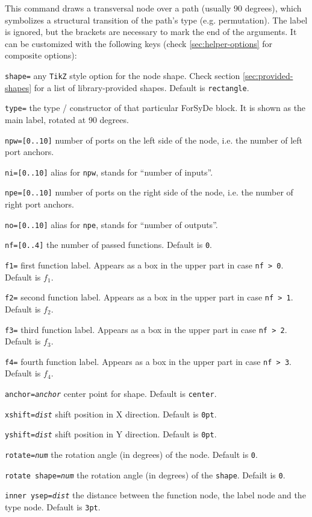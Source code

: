 \noindent This command draws a transversal node over a path (usually 90 degrees), which symbolizes a structural transition of the path's type (e.g. permutation). The label is ignored, but the brackets are necessary to mark the end of the arguments. It can be customized with the following keys (check \ref{sec:helper-options} for composite options):

\begin{optionslist}
\item \texttt{shape=} any \texttt{TikZ} style option for the node shape. Check section \ref{sec:provided-shapes} for a list of library-provided shapes. Default is \texttt{rectangle}.
\item \texttt{type=} the type / constructor of that particular ForSyDe block. It is shown as the main label, rotated at 90 degrees.
\item \texttt{npw=[0..10]} number of ports on the left side of the node, i.e. the number of left port anchors.
\item \texttt{ni=[0..10]} alias for \texttt{npw}, stands for ``number of inputs''.
\item \texttt{npe=[0..10]} number of ports on the right side of the node, i.e. the number of right port anchors.
\item \texttt{no=[0..10]} alias for \texttt{npe}, stands for ``number of outputs''.
\item \texttt{nf=[0..4]} the number of passed functions. Default is \texttt{0}.
\item \texttt{f1=} first function label. Appears as a box in the upper part in case \texttt{nf > 0}. Default is $f_1$.
\item \texttt{f2=} second function label. Appears as a box in the upper part in case \texttt{nf > 1}. Default is $f_2$.
\item \texttt{f3=} third function label. Appears as a box in the upper part in case \texttt{nf > 2}. Default is $f_3$.
\item \texttt{f4=} fourth function label. Appears as a box in the upper part in case \texttt{nf > 3}. Default is $f_4$.
\item \texttt{anchor=\it anchor} center point for shape. Default is \texttt{center}.
\item \texttt{xshift=\it dist} shift position in X direction. Default is \texttt{0pt}.
\item \texttt{yshift=\it dist} shift position in Y direction. Default is \texttt{0pt}.
\item \texttt{rotate=\it num} the rotation angle (in degrees) of the node. Default is \texttt{0}.
\item \texttt{rotate shape=\it num} the rotation angle (in degrees) of the \texttt{shape}. Defailt is \texttt{0}.
\item \texttt{inner ysep=\it dist} the distance between the function node, the label node and the type node. Default is \texttt{3pt}.
\end{optionslist}

